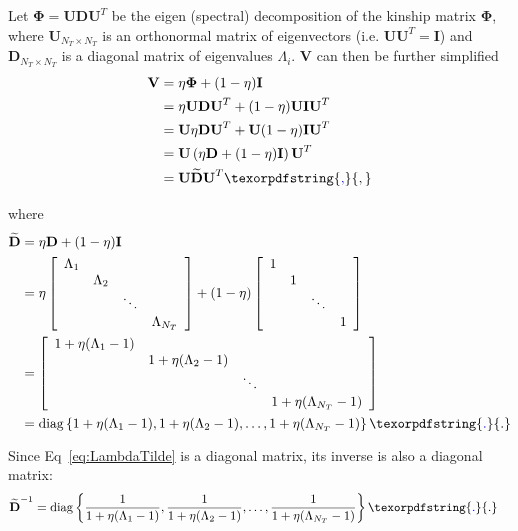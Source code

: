 \documentclass[10pt,letterpaper]{article}
\newcommand{\bD}{\textbf{D}}
\newcommand{\bU}{\textbf{U}}
\newcommand{\bV}{\textbf{V}}
\newcommand{\bI}{\textbf{I}}
\newcommand{\bPhi}{\boldsymbol{\Phi}}
\DeclareMathOperator{\diag}{diag} %
\providecommand{\DIFaddtex}[1]{{\protect\color{blue}\uwave{#1}}} %
\providecommand{\DIFaddbegin}{} %
\providecommand{\DIFaddend}{} %
\providecommand{\DIFadd}[1]{\texorpdfstring{\DIFaddtex{#1}}{#1}} %
\newcommand{\DIFaddincludegraphics}[2][]{{\color{blue}\fbox{\DIFOincludegraphics[#1]{#2}}}} %
\DeclareRobustCommand{\DIFaddbegin}{\DIFOaddbegin \let\includegraphics\DIFaddincludegraphics} %
\DeclareRobustCommand{\DIFaddend}{\DIFOaddend \let\includegraphics\DIFOincludegraphics} %
\begin{document}
Let $\bPhi = \bU \bD \bU^T$ be the eigen (spectral) decomposition of the kinship matrix $\bPhi$, where $\bU_{N_T \times N_T}$ is an orthonormal matrix of eigenvectors (i.e. $\bU \bU^T = \bI$) and $\bD_{N_T \times N_T}$ is a diagonal matrix of eigenvalues $\Lambda_i$. $\bV$ can then be further simplified~\cite{pirinen2013efficient}
\begin{align}
\bV & = \eta \bPhi + (1-\eta) \bI \nonumber \\
& = \eta \bU \bD \bU^T + (1-\eta) \bU \bI \bU^T \nonumber \\
& = \bU \eta  \bD \bU^T + \bU (1-\eta) \bI \bU^T \nonumber \\
& = \bU \left(\eta  \bD + (1-\eta) \bI\right) \bU^T \nonumber \\
& = \bU \widetilde{\bD} \bU^T  \label{eq:Vsimplified}\DIFaddbegin \DIFadd{,
}\DIFaddend \end{align}
where
\begin{align}
\widetilde{\bD} & = \eta  \bD + (1-\eta) \bI  \label{eq:LambdaTilde} \\
& =  \eta \left[ \begin{array}{cccc}
\Lambda_1 & \hfill & \hfill & \hfill  \\
\hfill & \Lambda_2 & \hfill & \hfill  \\
\hfill & \hfill & \ddots &\hfill  \\
\hfill & \hfill & \hfill & \Lambda_{N_T}  \\
\end{array} \right] + (1-\eta) \left[ \begin{array}{cccc}
1 & \hfill & \hfill & \hfill  \\
\hfill & 1 & \hfill & \hfill  \\
\hfill & \hfill & \ddots &\hfill  \\
\hfill & \hfill & \hfill & 1  \\
\end{array} \right]  \nonumber \\
& =   \left[ \begin{array}{cccc}
1 + \eta (\Lambda_1-1) & \hfill & \hfill & \hfill  \\
\hfill & 1 + \eta (\Lambda_2-1) & \hfill & \hfill  \\
\hfill & \hfill & \ddots &\hfill  \\
\hfill & \hfill & \hfill & 1 + \eta (\Lambda_{N_T}-1)  \\
\end{array} \right]   \nonumber \\
& = \diag\left\lbrace 1 + \eta (\Lambda_1-1), 1 + \eta (\Lambda_2-1), \ldots, 1 + \eta (\Lambda_{N_T}-1) \label{eq:DiagLambda} \right\rbrace\DIFaddbegin \DIFadd{.
}\DIFaddend \end{align}
Since Eq~\ref{eq:LambdaTilde} is a diagonal matrix, its inverse is also a diagonal matrix:
\begin{align}
\widetilde{\bD}^{-1} & = \diag\left\lbrace \frac{1}{1 + \eta (\Lambda_1-1)}, \frac{1}{1 + \eta (\Lambda_2-1)}, \ldots, \frac{1}{1 + \eta (\Lambda_{N_T}-1)} \label{eq:DiagInvLambda} \right\rbrace\DIFaddbegin \DIFadd{.
}\DIFaddend \end{align}
\end{document}
